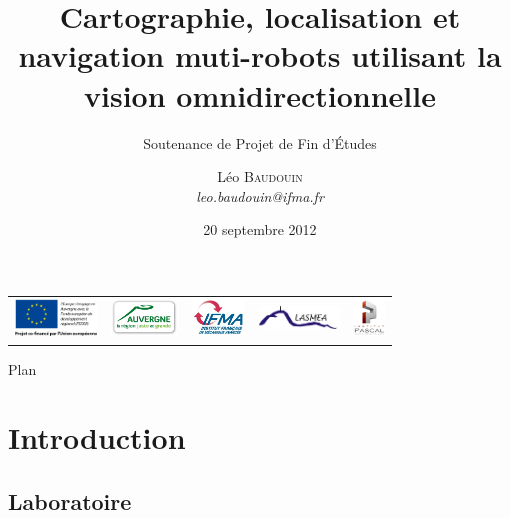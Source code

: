 \documentclass{beamer}
\title{Cartographie, localisation et navigation muti-robots utilisant la vision omnidirectionnelle}
\subtitle{Soutenance de Projet de Fin d'\'Etudes}
\author{L\'eo \textsc{Baudouin}\\\emph{leo.baudouin@ifma.fr}}
\institute{
  Institut Pascal (LASMEA)
}
\date{20 septembre 2012}
\begin{document}
\begin{frame}
  \titlepage
  \begin{tabular}{c c c c c}
    \begin{minipage}{0.2\linewidth}
      \includegraphics[height=10mm]{images/EU.jpg}
    \end{minipage}
    &
    \begin{minipage}{0.2\linewidth}
      \includegraphics[height=10mm]{images/auvergne.png}
    \end{minipage}
    &
    \begin{minipage}{0.12\linewidth}
      \includegraphics[height=10mm]{images/logo-IFMA.jpg}
    \end{minipage}
    &
    \begin{minipage}{0.2\linewidth}
      \includegraphics[height=6mm]{images/logo-LASMEA}
    \end{minipage}
    &
    \begin{minipage}{0.2\linewidth}
      \includegraphics[height=10mm]{images/logo-IP}
    \end{minipage}
  \end{tabular}
\end{frame}


\begin{frame}{Plan}
  \tableofcontents
\end{frame}


\section{Introduction}
\subsection*{Laboratoire}
\end{document}
